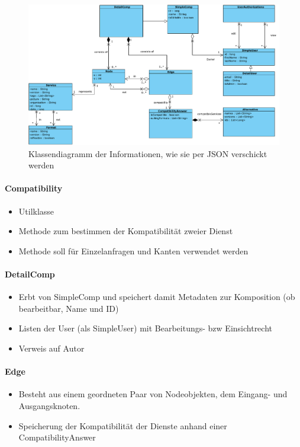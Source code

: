 \begin{figure}[!h]
	\centering
	\includegraphics[width=\textwidth]{img/Diagramme/Klassen/Send}
	\caption{Klassendiagramm der Informationen, wie sie per JSON verschickt werden}
	\label{fig:klassendiagramm-model}
\end{figure}



\paragraph{Compatibility}
\begin{itemize}
	\item Utilklasse
	\item Methode zum bestimmen der Kompatibilität zweier Dienst
	\item Methode soll für Einzelanfragen und Kanten verwendet werden
\end{itemize} 



\paragraph{DetailComp}
\begin{itemize}
	\item Erbt von SimpleComp und speichert damit Metadaten zur Komposition (ob bearbeitbar, Name und ID)
	\item Listen der User (als SimpleUser) mit Bearbeitungs- bzw Einsichtrecht
	\item Verweis auf Autor
\end{itemize}
\paragraph{Edge}
\begin{itemize}
	\item Besteht aus einem geordneten Paar von Nodeobjekten, dem Eingang- und Ausgangsknoten.
	\item Speicherung der Kompatibilität der Dienste anhand einer CompatibilityAnswer
\end{itemize}
